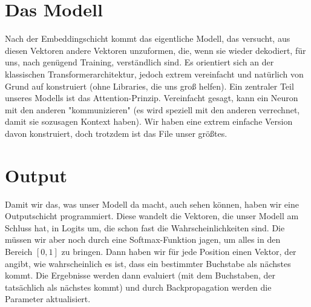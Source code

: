 \documentclass[12pt, letterpaper]{article}
\begin{document}
\section{Das Modell}
Nach der Embeddingschicht kommt das eigentliche Modell, das versucht, aus diesen Vektoren andere Vektoren unzuformen, die, wenn sie wieder dekodiert, für uns, nach genügend Training, verständlich sind. Es orientiert sich an der klassischen Transformerarchitektur, jedoch extrem vereinfacht und natürlich von Grund auf konstruiert (ohne Libraries, die uns groß helfen). Ein zentraler Teil unseres Modells ist das Attention-Prinzip. Vereinfacht gesagt, kann ein Neuron mit den anderen "kommunizieren" (es wird speziell mit den anderen verrechnet, damit sie sozusagen Kontext haben). Wir haben eine extrem einfache Version davon konstruiert, doch trotzdem ist das File unser größtes. 
\section{Output}
Damit wir das, was unser Modell da macht, auch sehen können, haben wir eine Outputschicht programmiert. Diese wandelt die Vektoren, die unser Modell am Schluss hat, in Logits um, die schon fast die Wahrscheinlichkeiten sind. Die müssen wir aber noch durch eine Softmax-Funktion jagen, um alles in den Bereich $[0, 1]$ zu bringen. Dann haben wir für jede Position einen Vektor, der angibt, wie wahrscheinlich es ist, dass ein bestimmter Buchstabe als nächstes kommt. Die Ergebnisse werden dann evaluiert (mit dem Buchstaben, der tatsächlich als nächstes kommt) und durch Backpropagation werden die Parameter aktualisiert. 
\end{document}
